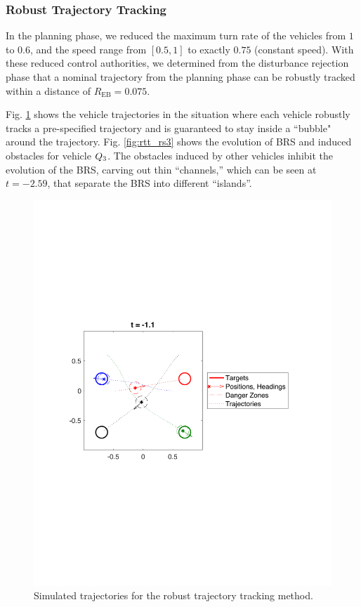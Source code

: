 \subsubsection{Robust Trajectory Tracking}
In the planning phase, we reduced the maximum turn rate of the vehicles from $1$ to $0.6$, and the speed range from $[0.5, 1]$ to exactly $0.75$ (constant speed). With these reduced control authorities, we determined from the disturbance rejection phase that a nominal trajectory from the planning phase can be robustly tracked within a distance of $R_{\text{EB}} = 0.075$.

Fig. \ref{fig:rtt_traj} shows the vehicle trajectories in the situation where each vehicle robustly tracks a pre-specified trajectory and is guaranteed to stay inside a ``bubble" around the trajectory. Fig. \ref{fig:rtt_rs3} shows the evolution of BRS and induced obstacles for vehicle $Q_3$. The obstacles induced by other vehicles inhibit the evolution of the BRS, carving out thin “channels,” which can be seen at $t = -2.59$, that separate the BRS into different “islands”. %

\begin{figure}
  \centering
  \includegraphics[width=0.95\columnwidth]{"fig/rtt_traj"}
  \caption{Simulated trajectories for the robust trajectory tracking method.}
  \label{fig:rtt_traj}
\end{figure}

